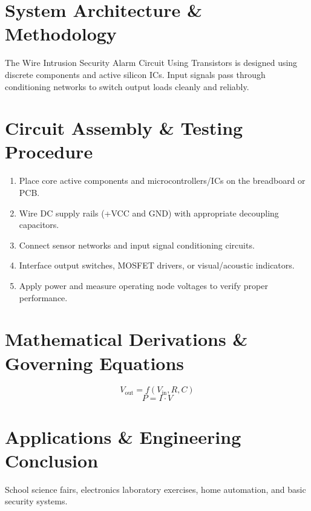 \documentclass[11pt,a4paper]{article}
\begin{document}
\section{System Architecture \& Methodology}
The Wire Intrusion Security Alarm Circuit Using Transistors is designed using discrete components and active silicon ICs. Input signals pass through conditioning networks to switch output loads cleanly and reliably.

\section{Circuit Assembly \& Testing Procedure}
\begin{enumerate}
    \item Place core active components and microcontrollers/ICs on the breadboard or PCB.
    \item Wire DC supply rails (+VCC and GND) with appropriate decoupling capacitors.
    \item Connect sensor networks and input signal conditioning circuits.
    \item Interface output switches, MOSFET drivers, or visual/acoustic indicators.
    \item Apply power and measure operating node voltages to verify proper performance.
\end{enumerate}

\section{Mathematical Derivations \& Governing Equations}
\begin{equation}
V_{\text{out}} = f(V_{\text{in}}, R, C)
\end{equation}
\begin{equation}
P = I \cdot V
\end{equation}

\section{Applications \& Engineering Conclusion}
School science fairs, electronics laboratory exercises, home automation, and basic security systems.
\end{document}

